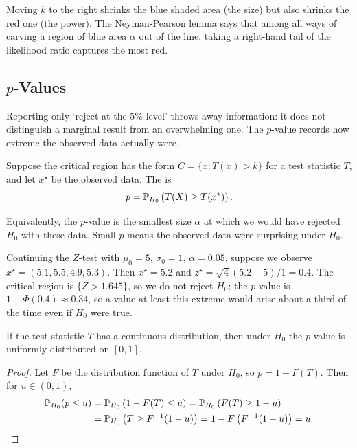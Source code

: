 \documentclass[a4paper]{scrartcl}
\begin{document}
Moving $k$ to the right shrinks the blue shaded area (the size) but also shrinks the red one (the power). The Neyman-Pearson lemma says that among all ways of carving a region of blue area $\alpha$ out of the line, taking a right-hand tail of the likelihood ratio captures the most red.

\subsection{\texorpdfstring{$p$}{p}-Values}

Reporting only `reject at the $5\%$ level' throws away information: it does not distinguish a marginal result from an overwhelming one. The $p$-value records how extreme the observed data actually were.

\begin{definition}[$p$-Value]
  Suppose the critical region has the form $C = \{x : T(x) > k\}$ for a test statistic $T$, and let $x^\star$ be the observed data. The  is
  $$
  p = \mathbb{P}_{H_0}\left(T(X) \geq T(x^\star)\right).
  $$
\end{definition}

Equivalently, the $p$-value is the smallest size $\alpha$ at which we would have rejected $H_0$ with these data. Small $p$ means the observed data were surprising under $H_0$.

\begin{example}
  Continuing the $Z$-test with $\mu_0 = 5$, $\sigma_0 = 1$, $\alpha = 0.05$, suppose we observe $x^\star = (5.1, 5.5, 4.9, 5.3)$. Then $\overline{x^\star} = 5.2$ and $z^\star = \sqrt{4}(5.2 - 5)/1 = 0.4$. The critical region is $\{Z > 1.645\}$, so we do not reject $H_0$; the $p$-value is $1 - \Phi(0.4) \approx 0.34$, so a value at least this extreme would arise about a third of the time even if $H_0$ were true.
\end{example}

\begin{proposition}
  If the test statistic $T$ has a continuous distribution, then under $H_0$ the $p$-value is uniformly distributed on $[0,1]$.
\end{proposition}
\begin{proof}
  Let $F$ be the distribution function of $T$ under $H_0$, so $p = 1 - F(T)$. Then for $u \in (0,1)$,
  \begin{align*}
    \mathbb{P}_{H_0}(p \leq u) &= \mathbb{P}_{H_0}\left(1 - F(T) \leq u\right)= \mathbb{P}_{H_0}\left(F(T) \geq 1-u\right)\\
    &= \mathbb{P}_{H_0}\left(T \geq F^{-1}(1-u)\right) = 1 - F\left(F^{-1}(1-u)\right) = u. \qedhere
  \end{align*}
\end{proof}
\end{document}
